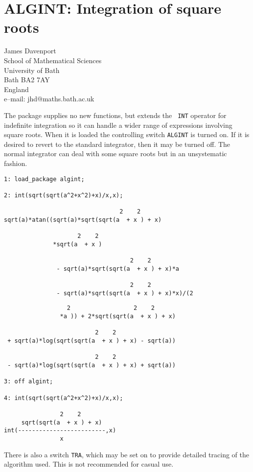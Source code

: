 \chapter{ALGINT: Integration of square roots}
\label{ALGINT}

{\footnotesize
\begin{center}
James Davenport \\
School of Mathematical Sciences \\
University of Bath \\
Bath BA2 7AY \\
England \\[0.05in]
e--mail: jhd@maths.bath.ac.uk
\end{center}
}

The package supplies no new functions, but extends the {\tt
INT} operator for indefinite integration so it can handle
a wider range of expressions involving square roots.  When it is
loaded the controlling switch {\tt ALGINT} is turned
on.  If it is desired to revert to the standard integrator, then it
may be turned off.  The normal integrator can deal with some square
roots but in an unsystematic fashion.

\begin{verbatim}
1: load_package algint;

2: int(sqrt(sqrt(a^2+x^2)+x)/x,x);

                                 2    2
sqrt(a)*atan((sqrt(a)*sqrt(sqrt(a  + x ) + x)

                     2    2
              *sqrt(a  + x )

                                    2    2
               - sqrt(a)*sqrt(sqrt(a  + x ) + x)*a

                                    2    2
               - sqrt(a)*sqrt(sqrt(a  + x ) + x)*x)/(2
\end{verbatim}
\newpage
\begin{verbatim}
                  2                  2    2
                *a )) + 2*sqrt(sqrt(a  + x ) + x)

                          2    2
 + sqrt(a)*log(sqrt(sqrt(a  + x ) + x) - sqrt(a))

                          2    2
 - sqrt(a)*log(sqrt(sqrt(a  + x ) + x) + sqrt(a))

3: off algint;

4: int(sqrt(sqrt(a^2+x^2)+x)/x,x);

                2    2
     sqrt(sqrt(a  + x ) + x)
int(-------------------------,x)
                x

\end{verbatim}

There is also a switch {\tt TRA}, which may be set on to
provide detailed tracing of the algorithm used.  This is not
recommended for casual use.

